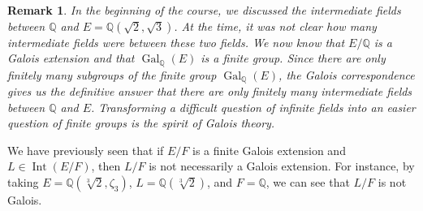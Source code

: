 \documentclass[10pt]{article}
\newcommand{\Q}{\mathbb{Q}}
\DeclareMathOperator{\Gal}{Gal}
\DeclareMathOperator{\Int}{Int}
\theoremstyle{newstyle}
\newtheorem{remark}[thm]{Remark}
\begin{document}
\begin{remark}
In the beginning of the course, we discussed the intermediate fields between $\Q$ and 
$E = \Q(\sqrt2, \sqrt3)$. At the time, it was not clear how many intermediate fields 
were between these two fields. We now know that $E/\Q$ is a Galois extension and that 
$\Gal_{\Q}(E)$ is a finite group. Since there are only finitely many subgroups of the 
finite group $\Gal_{\Q}(E)$, the Galois correspondence gives us the definitive answer that 
there are only finitely many intermediate fields between $\Q$ and $E$. Transforming 
a difficult question of infinite fields into an easier question of finite groups is 
the spirit of Galois theory. 
\end{remark}

We have previously seen that if $E/F$ is a finite Galois extension and $L \in \Int(E/F)$, then 
$L/F$ is not necessarily a Galois extension. For instance, by taking 
$E = \Q(\sqrt[3]{2}, \zeta_3)$, $L = \Q(\sqrt[3]{2})$, and $F = \Q$, we can see that $L/F$ 
is not Galois. 
\end{document}
